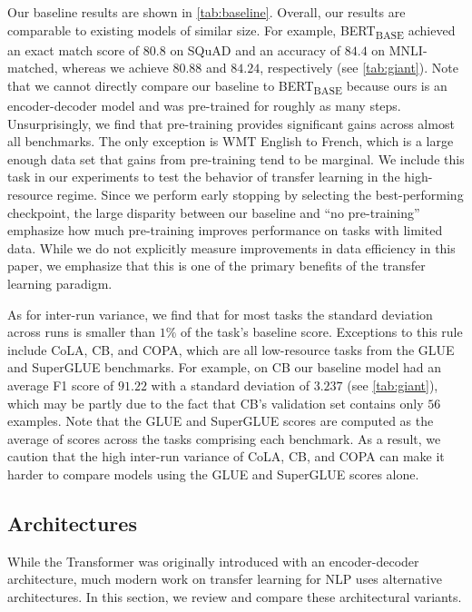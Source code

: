 \documentclass[twoside,11pt]{article}
\begin{document}
Our baseline results are shown in \cref{tab:baseline}.
Overall, our results are comparable to existing models of similar size.
For example, BERT\textsubscript{BASE} achieved an exact match score of $80.8$ on SQuAD and an accuracy of $84.4$ on MNLI-matched, whereas we achieve $80.88$ and $84.24$, respectively (see \cref{tab:giant}).
Note that we cannot directly compare our baseline to BERT\textsubscript{BASE} because ours is an encoder-decoder model and was pre-trained for roughly  as many steps.
Unsurprisingly, we find that pre-training provides significant gains across almost all benchmarks.
The only exception is WMT English to French, which is a large enough data set that gains from pre-training tend to be marginal.
We include this task in our experiments to test the behavior of transfer learning in the high-resource regime.
Since we perform early stopping by selecting the best-performing checkpoint, the large disparity between our baseline and ``no pre-training'' emphasize how much pre-training improves performance on tasks with limited data.
While we do not explicitly measure improvements in data efficiency in this paper, we emphasize that this is one of the primary benefits of the transfer learning paradigm.

As for inter-run variance, we find that for most tasks the standard deviation across runs is smaller than $1\%$ of the task's baseline score.
Exceptions to this rule include CoLA, CB, and COPA, which are all low-resource tasks from the GLUE and SuperGLUE benchmarks.
For example, on CB our baseline model had an average F1 score of $91.22$ with a standard deviation of $3.237$ (see \cref{tab:giant}), which may be partly due to the fact that CB's validation set contains only $56$ examples.
Note that the GLUE and SuperGLUE scores are computed as the average of scores across the tasks comprising each benchmark.
As a result, we caution that the high inter-run variance of CoLA, CB, and COPA can make it harder to compare models using the GLUE and SuperGLUE scores alone.

\subsection{Architectures}
\label{sec:architectures}

While the Transformer was originally introduced with an encoder-decoder architecture, much modern work on transfer learning for NLP uses alternative architectures.
In this section, we review and compare these architectural variants.
\end{document}
